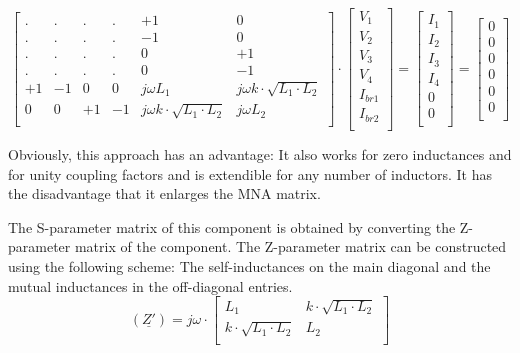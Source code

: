 \begin{equation}
\begin{bmatrix}
. & . & . & . & +1 &  0\\
. & . & . & . & -1 &  0\\
. & . & . & . &  0 & +1\\
. & . & . & . &  0 & -1\\
+1 & -1 & 0 & 0 & j\omega L_1 & j\omega k\cdot\sqrt{L_1\cdot L_2} \\
0 & 0 & +1 & -1 & j\omega k\cdot\sqrt{L_1\cdot L_2} & j\omega L_2 \\
\end{bmatrix}
\cdot
\begin{bmatrix}
V_1\\
V_2\\
V_3\\
V_4\\
I_{br1}\\
I_{br2}\\
\end{bmatrix}
=
\begin{bmatrix}
I_1\\
I_2\\
I_3\\
I_4\\
0\\
0\\
\end{bmatrix}
=
\begin{bmatrix}
0\\
0\\
0\\
0\\
0\\
0\\
\end{bmatrix}
\end{equation}

Obviously, this approach has an advantage: It also works for zero
inductances and for unity coupling factors and is extendible for any
number of inductors.  It has the disadvantage that it enlarges the MNA
matrix.

\addvspace{12pt}

The S-parameter matrix of this component is obtained by converting the
Z-parameter matrix of the component.  The Z-parameter matrix can be
constructed using the following scheme: The self-inductances on the
main diagonal and the mutual inductances in the off-diagonal entries.
\begin{equation}
\left(\underline{Z'}\right) =
j\omega\cdot
\begin{bmatrix}
L_1 & k\cdot\sqrt{L_1\cdot L_2} \\
k\cdot\sqrt{L_1\cdot L_2} & L_2\\
\end{bmatrix}
\end{equation}

